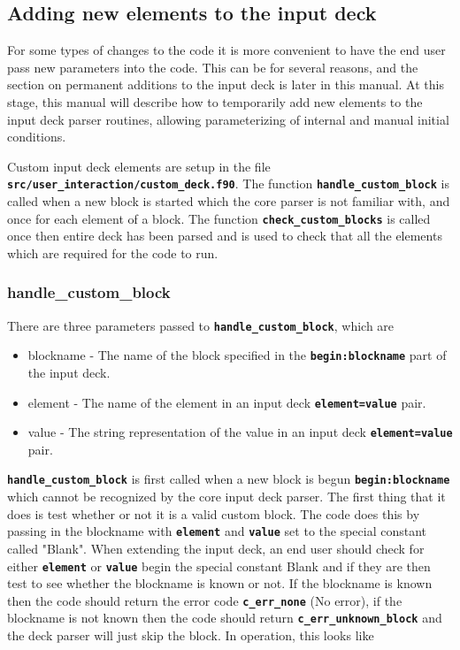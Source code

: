 \documentclass[12pt,a4paper]{article}
\newcommand{\inlinecode}[1]{{\color{warwickred} \bf\texttt{#1}}}
\begin{document}
\subsection{Adding new elements to the input deck}

For some types of changes to the code it is more convenient to have the end
user pass new parameters into the code. This can be for several reasons, and
the section on permanent additions to the input deck is later in this
manual. At this stage, this manual will describe how to temporarily add new
elements to the input deck parser routines, allowing parameterizing of
internal and manual initial conditions.

Custom input deck elements are setup in the file
\inlinecode{src/user\_interaction/custom\_deck.f90}. The function
\inlinecode{handle\_custom\_block} is called when a new block is started which the
core parser is not familiar with, and once for each element of a block. The
function \inlinecode{check\_custom\_blocks} is called once then entire deck has
been parsed and is used to check that all the elements which are required for
the code to run.

\subsubsection{handle\_custom\_block}
There are three parameters passed to \inlinecode{handle\_custom\_block}, which are
\begin{itemize}
\item blockname - The name of the block specified in the
  \inlinecode{begin:blockname} part of the input deck.
\item element - The name of the element in an input deck
  \inlinecode{element=value} pair.
\item value - The string representation of the value in an input deck
  \inlinecode{element=value} pair.
\end{itemize}

\inlinecode{handle\_custom\_block} is first called when a new block is begun
\inlinecode{begin:blockname} which cannot be recognized by the core input deck
parser. The first thing that it does is test whether or not it is a valid
custom block. The code does this by passing in the blockname with
\inlinecode{element} and \inlinecode{value} set to the special constant called
"Blank". When extending the input deck, an end user should check for either
\inlinecode{element} or \inlinecode{value} begin the special constant Blank
and if they are then test to see whether the blockname is known or not. If the
blockname is known then the code should return the error code
\inlinecode{c\_err\_none} (No error), if the blockname is not known then the code
should return \inlinecode{c\_err\_unknown\_block} and the deck parser will just
skip the block. In operation, this looks like
\end{document}
